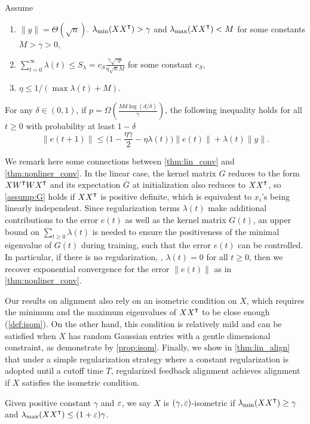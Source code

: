 \begin{theorem}
\label{thm:lin_conv}
Assume
\begin{enumerate}
\item $\|y\| = \Theta(\sqrt n)$. $\lambda_{\min}(XX\transpose)>\gamma$ and $\lambda_{\max}(XX\transpose)<M$ for some constants $M>\gamma>0$,
\item $\sum_{t=0}^\infty \lambda(t) \leq  S_\lambda = c_{S}\frac{\gamma\sqrt{\gamma p}}{\eta\sqrt{n}M}$ for some constant $c_{S}$,
\item $\eta \leq 1/(\max \lambda(t)+M)$.
\end{enumerate}
For any $\delta\in(0,1)$, if $p = \Omega(\frac{Md\log(d/\delta)}{\gamma})$, the following inequality holds for all $t\geq 0$ with probability at least $1-\delta$
\begin{equation}
\label{eq:reg_error_bd}
\|e(t+1)\|\leq \big(1-\frac{\eta\gamma}{2}-\eta\lambda(t)\big)\|e(t)\| + \lambda(t)\|y\|.
\end{equation} 
\end{theorem}

We remark here some connections between \cref{thm:lin_conv} and \cref{thm:nonliner_conv}. In the linear case, the kernel matrix $G$ reduces to the form $X W\transpose W X\transpose$ and its expectation $\overline{G}$ at initialization also reduces to $X X\transpose$, so \cref{assump:G} holds if $XX\transpose$ is positive definite, which is equivalent to $x_i$'s being linearly independent. Since regularization terms $\lambda(t)$ make additional contributions to the error $e(t)$ as well as the kernel matrix $G(t)$, an upper bound on $\sum_{t\geq 0}\lambda(t)$ is needed to ensure the positiveness of the minimal eigenvalue of $G(t)$ during training, such that the error $e(t)$ can be controlled. In particular, if there is no regularization, \ie, $\lambda(t)=0$ for all $t\geq 0$, then we recover exponential convergence for the error $\|e(t)\|$ as in \cref{thm:nonliner_conv}.

Our results on alignment also rely on an isometric condition on $X$, which requires the minimum and the maximum eigenvalues of $XX\transpose$ to be close enough (\cf \cref{def:isom}). On the other hand, this condition is relatively mild and can be satisfied when $X$ has random Gaussian entries with a gentle dimensional constraint, as demonstrate by \cref{prop:isom}. Finally, we show in \cref{thm:lin_align} that under a simple regularization strategy where a constant regularization is adopted until a cutoff time $T$, regularized feedback alignment achieves alignment if $X$ satisfies the isometric condition.
{}
\begin{definition}
\label{def:isom}
Given positive constant $\gamma$ and $\varepsilon$, we say $X$ is $(\gamma, \varepsilon)$-isometric if 
$\lambda_{\min}(XX\transpose)\geq\gamma$ and $\lambda_{\max}(XX\transpose)\leq(1+\eps)\gamma$.
\end{definition}

